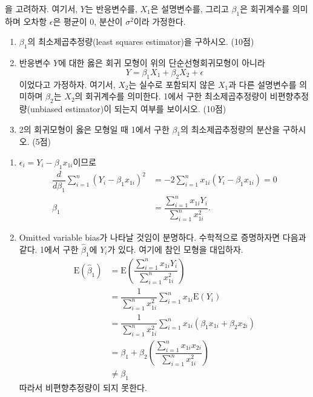 \documentclass[answers]{exam}
\begin{document}
\begin{questions}
$$   $$
   을 고려하자. 여기서, $Y$는 반응변수를, $X_{1}$은 설명변수를, 그리고 $\beta_{1}$은 회귀계수를 의미하며 오차항 $\epsilon$은 평균이 0, 분산이 $\sigma^{2}$이라 가정한다.
   \begin{enumerate}
    \item $\beta_{1}$의 최소제곱추정량(least squares estimator)을 구하시오. (10점)
    \item 반응변수 $Y$에 대한 옳은 회귀 모형이 위의 단순선형회귀모형이 아니라 
    $$
      Y = \beta_{1}X_{1}+\beta_{2}X_{2}+\epsilon
    $$
    이었다고 가정하자. 여기서, $X_{2}$는 실수로 포함되지 않은 $X_{1}$과 다른 설명변수를 의미하며 $\beta_{2}$는 $X_{2}$의 회귀계수를 의미한다. 1에서 구한 최소제곱추정량이 비편향추정량(unbiased estimator)이 되는지 여부를 보이시오. (10점)
    \item 2의 회귀모형이 옳은 모형일 때 1에서 구한 $\beta_{1}$의 최소제곱추정량의 분산을 구하시오. (5점)
   \end{enumerate}
   \pagebreak
   \begin{solution}
    \begin{enumerate}
      \item $\epsilon_{i} = Y_{i}-\beta_{1}x_{1i}$이므로
      \begin{align}
        \dfrac{d}{d\beta_{1}}\sum_{i=1}^{n}\left(Y_{i}-\beta_{1}x_{1i}\right)^{2} &= -2\sum_{i=1}^{n}x_{1i}\left(Y_{i}-\beta_{1}x_{1i}\right)=0\\
        \widehat{\beta}_{1} &= \dfrac{\sum_{i=1}^{n}x_{1i}Y_{i}}{\sum_{i=1}^{n}x_{1i}^{2}}.
      \end{align}
      \item Omitted variable bias가 나타날 것임이 분명하다. 수학적으로 증명하자면 다음과 같다. 1에서 구한 $\widehat{\beta}_{1}$에 $Y_{i}$가 있다. 여기에 참인 모형을 대입하자.
      \begin{align}
        \mathrm{E}\left(\widehat{\beta}_{1}\right) &= \mathrm{E}\left(\dfrac{\sum_{i=1}^{n}x_{1i}Y_{i}}{\sum_{i=1}^{n}x_{1i}^{2}}\right)\\
        &= \dfrac{1}{\sum_{i=1}^{n}x_{1i}^{2}}\sum_{i=1}^{n}x_{1i}\mathrm{E}\left(Y_{i}\right)\\
        &= \dfrac{1}{\sum_{i=1}^{n}x_{1i}^{2}}\sum_{i=1}^{n}x_{1i}\left(\beta_{1}x_{1i}+\beta_{2}x_{2i}\right)\\
        &= \beta_{1}+\beta_{2}\left(\dfrac{\sum_{i=1}^{n}x_{1i}x_{2i}}{\sum_{i=1}^{n}x_{1i}^{2}}\right) \\
        &\neq \beta_{1}
      \end{align}
      따라서 비편향추정량이 되지 못한다.

\end{enumerate}
\end{solution}
\end{questions}
\end{document}

